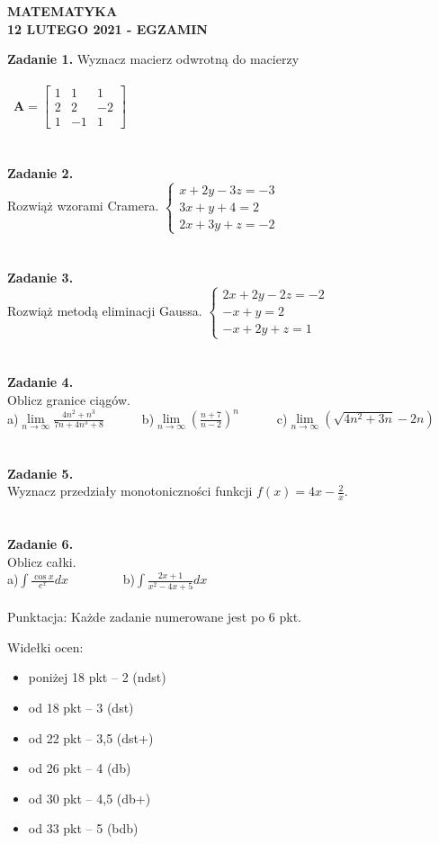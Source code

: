 \documentclass[12pt,a4paper]{report}
\begin{document}
\begin{center}

\textbf{MATEMATYKA \\12 LUTEGO 2021 - EGZAMIN}

\end{center}\textbf{Zadanie 1.} Wyznacz macierz odwrotną do macierzy \\\\\ $\mathbf{A} =\left[ \begin{array}{ccc}1 & 1& 1\\2& 2& -2\\1 & -1& 1\end{array} \right]$\\\\\\\textbf{Zadanie 2.} \\Rozwiąż wzorami Cramera. $\left\{ \begin{array}{ll}x+2y-3z=-3\\ 3x+y+4=2\\2x+3y+z=-2\end{array} \right.$\\\\\\\textbf{Zadanie 3.} \\Rozwiąż metodą eliminacji Gaussa. $\left\{ \begin{array}{ll}2x+2y-2z=-2\\ -x+y=2\\-x+2y+z=1\end{array} \right.$\\\\\\\textbf{Zadanie 4.} \\Oblicz granice ciągów.\\a)$\lim\limits_{n\to\infty}\frac{4n^2+n^3}{7n+4n^3+8}$\ \ \ \ \ \  b)$\lim\limits_{n\to \infty}(\frac{n+7}{n-2})^n$\ \ \ \ \ \ c)$\lim\limits_{n\to\infty}\left( \sqrt{4n^2+3n}-2n\right)$\\\\\\\textbf{Zadanie 5.} \\Wyznacz przedziały monotoniczności funkcji $f(x)=4x-\frac{2}{x}$.\\\\\\\textbf{Zadanie 6.} \\Oblicz całki. \\a)$\int \frac{\cos x}{e^x} dx$ \ \ \ \ \ \ \ \ b)$\int \frac{2x+1}{x^2-4x+5} dx$\\\\Punktacja: Każde zadanie numerowane jest po 6 pkt.



Widełki ocen:

\begin{itemize}

\item poniżej 18 pkt -- 2 (ndst)

\item od 18 pkt -- 3 (dst)

\item od 22 pkt -- 3,5 (dst+)

\item od 26 pkt -- 4 (db)

\item od 30 pkt -- 4,5 (db+)

\item od 33 pkt -- 5 (bdb)

\end{itemize}
\end{document}
